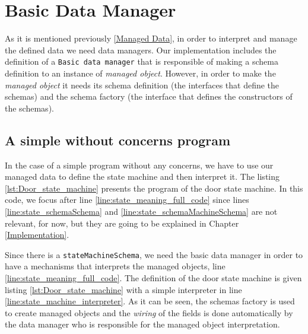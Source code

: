\section{Basic Data Manager}
As it is mentioned previously \ref{Managed Data}, in order to interpret and manage the defined data we need data managers. 
Our implementation includes the definition of a \texttt{Basic data manager} that is responsible of making a schema definition to an instance of \textit{managed object}.
However, in order to make the \textit{managed object} it needs its schema definition (the interfaces that define the schemas) and the schema factory (the interface that defines the constructors of the schemas).

\subsection{A simple without concerns program}
In the case of a simple program without any concerns, we have to use our managed data to define the state machine and then interpret it.
The listing \ref{lst:Door_state_machine} presents the program of the door state machine.
In this code, we focus after line \ref{line:state_meaning_full_code} since lines \ref{line:state_schemaSchema} and \ref{line:state_schemaMachineSchema} are not relevant, for now, but they are going to be explained in Chapter \ref{Implementation}.

Since there is a \texttt{stateMachineSchema}, we need the basic data manager in order to have a mechanisms that interprets the managed objects, line \ref{line:state_meaning_full_code}.
The definition of the door state machine is given listing \ref{lst:Door_state_machine} with a simple interpreter in line \ref{line:state_machine_interpreter}.
As it can be seen, the schemas factory is used to create managed objects and the \textit{wiring} of the fields is done automatically by the data manager who is responsible for the managed object interpretation.

